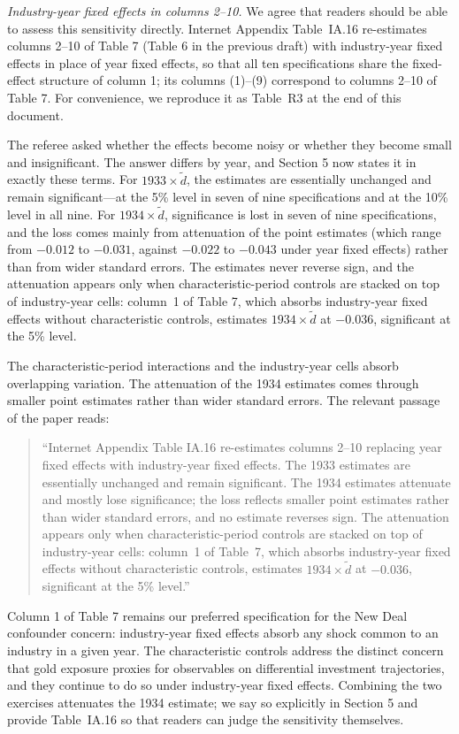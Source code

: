 \medskip
\noindent \textit{Industry-year fixed effects in columns 2--10.} We agree that readers should be able to assess this sensitivity directly. Internet Appendix Table~IA.16 re-estimates columns 2--10 of Table 7 (Table 6 in the previous draft) with industry-year fixed effects in place of year fixed effects, so that all ten specifications share the fixed-effect structure of column 1; its columns (1)--(9) correspond to columns 2--10 of Table 7. For convenience, we reproduce it as Table~R3 at the end of this document.

\medskip
\noindent The referee asked whether the effects become noisy or whether they become small and insignificant. The answer differs by year, and Section 5 now states it in exactly these terms. For $1933 \times \tilde{d}$, the estimates are essentially unchanged and remain significant---at the 5\% level in seven of nine specifications and at the 10\% level in all nine. For $1934 \times \tilde{d}$, significance is lost in seven of nine specifications, and the loss comes mainly from attenuation of the point estimates (which range from $-0.012$ to $-0.031$, against $-0.022$ to $-0.043$ under year fixed effects) rather than from wider standard errors. The estimates never reverse sign, and the attenuation appears only when characteristic-period controls are stacked on top of industry-year cells: column~1 of Table 7, which absorbs industry-year fixed effects without characteristic controls, estimates $1934 \times \tilde{d}$ at $-0.036$, significant at the 5\% level.

\medskip
\noindent The characteristic-period interactions and the industry-year cells absorb overlapping variation. The attenuation of the 1934 estimates comes through smaller point estimates rather than wider standard errors. The relevant passage of the paper reads:

\begin{quote}
``Internet Appendix Table IA.16 re-estimates columns 2--10 replacing year fixed effects with industry-year fixed effects. The 1933 estimates are essentially unchanged and remain significant. The 1934 estimates attenuate and mostly lose significance; the loss reflects smaller point estimates rather than wider standard errors, and no estimate reverses sign. The attenuation appears only when characteristic-period controls are stacked on top of industry-year cells: column~1 of Table~7, which absorbs industry-year fixed effects without characteristic controls, estimates $1934 \times \tilde{d}$ at $-0.036$, significant at the 5\% level.''
\end{quote}

\medskip
\noindent Column 1 of Table 7 remains our preferred specification for the New Deal confounder concern: industry-year fixed effects absorb any shock common to an industry in a given year. The characteristic controls address the distinct concern that gold exposure proxies for observables on differential investment trajectories, and they continue to do so under industry-year fixed effects. Combining the two exercises attenuates the 1934 estimate; we say so explicitly in Section 5 and provide Table~IA.16 so that readers can judge the sensitivity themselves.
